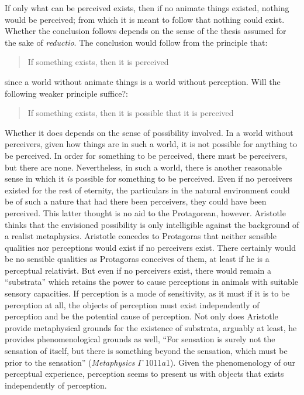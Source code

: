 If only what can be perceived exists, then if no animate things existed, nothing would be perceived; from which it is meant to follow that nothing could exist. Whether the conclusion follows depends on the sense of the thesis assumed for the sake of \emph{reductio}. The conclusion would follow from the principle that:
\begin{quote}
	If something exists, then it is perceived
\end{quote}
since a world without animate things is a world without perception. Will the following weaker principle suffice?:
\begin{quote}
	If something exists, then it is possible that it is perceived 
\end{quote}
Whether it does depends on the sense of possibility involved. In a world without perceivers, given how things are in such a world, it is not possible for anything to be perceived. In order for something to be perceived, there must be perceivers, but there are none. Nevertheless, in such a world, there is another reasonable sense in which it \emph{is} possible for something to be perceived. Even if no perceivers existed for the rest of eternity, the particulars in the natural environment could be of such a nature that had there been perceivers, they could have been perceived. This latter thought is no aid to the Protagorean, however. Aristotle thinks that the envisioned possibility is only intelligible against the background of a realist metaphysics. Aristotle concedes to Protagoras that neither sensible qualities nor perceptions would exist if no perceivers exist. There certainly would be no sensible qualities as Protagoras conceives of them, at least if he is a perceptual relativist. But even if no perceivers exist, there would remain a ``substrata'' which retains the power to cause perceptions in animals with suitable sensory capacities. If perception is a mode of sensitivity, as it must if it is to be perception at all, the objects of perception must exist independently of perception and be the potential cause of perception. Not only does Aristotle provide metaphysical grounds for the existence of substrata, arguably at least, he provides phenomenological grounds as well, ``For sensation is surely not the sensation of itself, but there is something beyond the sensation, which must be prior to the sensation'' (\emph{Metaphysics} \( \Gamma \) 1011\( a \)1). Given the phenomenology of our perceptual experience, perception seems to present us with objects that exists independently of perception.

